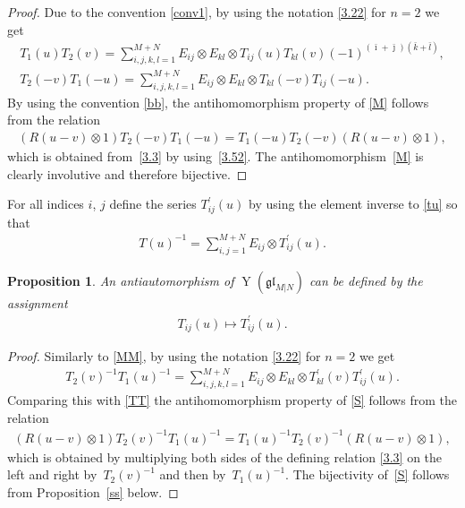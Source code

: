 \documentclass[pdftex]{sigma}
\numberwithin{equation}{section}
\newtheorem{Proposition}[Theorem]{Proposition}
\def\bi{{\bar\imath }}
\def\bj{{\bar\jmath }}
\def\bk{{\bar k }}
\def\bl{{\bar l }}
\def\glMN{\mathfrak{gl}_{M|N}}
\def\ot{\otimes}
\def\TP{T^{\prime}}
\def\YMN{\operatorname{Y}(\glMN)}
\begin{document}
\begin{proof}Due to the convention \eqref{conv1}, by using
the notation \eqref{3.22} for $n=2$ we get
\begin{gather}\label{TT}
T_1(u) T_2(v)=\sum_{i,j,k,l=1}^{M+N}
E_{ij}\ot E_{kl}\ot T_{ij}(u) T_{kl}(v)
{(-1)}^{( \bi+ \bj )( \bk+ \bl )} ,\\
\label{MM}
T_2(-v) T_1(-u)=\sum_{i,j,k,l=1}^{M+N}
E_{ij}\ot E_{kl}\ot T_{kl}(-v) T_{ij}(-u) .
\end{gather}
By using the convention \eqref{bb}, the antihomomorphism property of \eqref{M} follows from the relation
\begin{gather*}
(R (u-v)\ot1) T_2(-v) T_1(-u)=
T_1(-u) T_2(-v) (R (u-v)\ot1),
\end{gather*}
which is obtained from~\eqref{3.3} by using~\eqref{3.52}.
The antihomomorphism~\eqref{M} is clearly involutive and therefore bijective.
\end{proof}

For all indices $i$, $j$ define the series $\TP_{ij}(u)$
by using the element inverse to \eqref{tu} so that
\begin{gather}\label{tunat}
T(u)^{-1}=\sum_{i,j=1}^{M+N} E_{ij}\ot\TP_{ij}(u) .
\end{gather}

\begin{Proposition}\label{s}
An antiautomorphism of $\YMN$ can be defined by the assignment
\begin{gather}\label{S}
T_{ij}(u)\mapsto\TP_{ij}(u) .
\end{gather}
\end{Proposition}

\begin{proof}Similarly to \eqref{MM}, by using
the notation \eqref{3.22} for $n=2$ we get
\begin{gather*}
T_2(v)^{-1} T_1(u)^{-1}=\sum_{i,j,k,l=1}^{M+N}E_{ij}\ot E_{kl}\ot\TP_{kl}(v) \TP_{ij}(u) .
\end{gather*}
Comparing this with \eqref{TT} the antihomomorphism property of \eqref{S} follows from the relation
\begin{gather}\label{3.33}
(R (u-v)\ot1) T_2(v)^{-1} T_1(u)^{-1}=
T_1(u)^{-1} T_2(v)^{-1} (R (u-v)\ot1),
\end{gather}
which is obtained by multiplying both sides of the defining relation \eqref{3.3}
on the left and right by~$T_2(v)^{-1}$ and then by~$T_1(u)^{-1}$.
The bijectivity of~\eqref{S} follows from Proposition~\ref{ss} below.
\end{proof}
\end{document}
